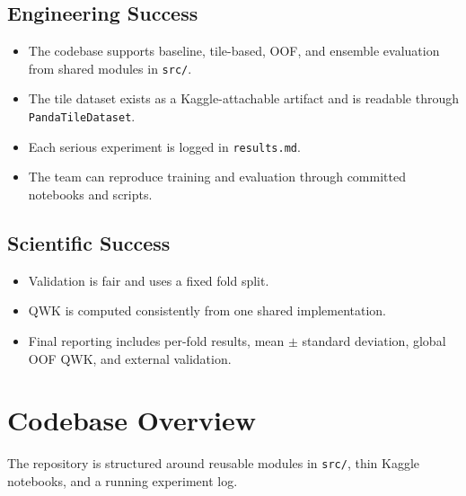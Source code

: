 \documentclass[11pt]{article}
\begin{document}
\subsection{Engineering Success}

\begin{itemize}[leftmargin=*]
    \item The codebase supports baseline, tile-based, OOF, and ensemble evaluation from shared modules in \texttt{src/}.
    \item The tile dataset exists as a Kaggle-attachable artifact and is readable through \texttt{PandaTileDataset}.
    \item Each serious experiment is logged in \texttt{results.md}.
    \item The team can reproduce training and evaluation through committed notebooks and scripts.
\end{itemize}

\subsection{Scientific Success}

\begin{itemize}[leftmargin=*]
    \item Validation is fair and uses a fixed fold split.
    \item QWK is computed consistently from one shared implementation.
    \item Final reporting includes per-fold results, mean $\pm$ standard deviation, global OOF QWK, and external validation.
\end{itemize}

\section{Codebase Overview}

The repository is structured around reusable modules in \texttt{src/}, thin Kaggle notebooks, and a running experiment log.
\end{document}
